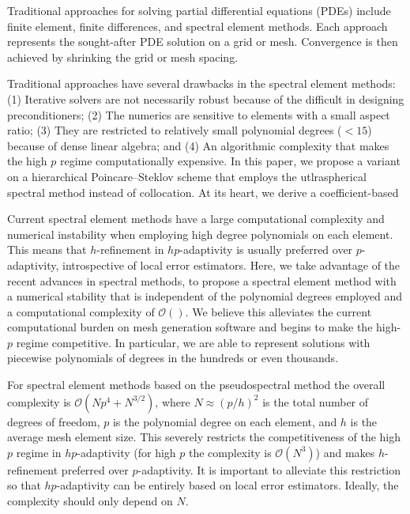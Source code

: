 \documentclass[review]{siamart171218}
\begin{document}
Traditional approaches for solving partial differential equations (PDEs) include finite element, finite differences, and spectral element methods. Each approach represents the sought-after PDE solution on a grid or mesh. Convergence is then achieved by shrinking the grid or mesh spacing. 

Traditional approaches have several drawbacks in the spectral element methods: (1) Iterative solvers are not necessarily robust because of the difficult in designing preconditioners; 
(2) The numerics are sensitive to elements with a small aspect ratio; (3) They are restricted to relatively small polynomial degrees ($<15$) because of dense linear algebra; and (4) An algorithmic complexity that makes the high $p$ regime computationally expensive. In this paper, we propose a variant on a hierarchical Poincare--Steklov scheme that employs the utlraspherical spectral method instead of collocation. At its heart, we derive a coefficient-based 




 
Current spectral element methods have a large computational complexity and numerical instability when employing high degree polynomials on each element. This means that $h$-refinement in $hp$-adaptivity is usually preferred over $p$-adaptivity, introspective of local error estimators. Here, we take advantage of the recent advances in spectral methods, to propose a spectral element method with a numerical stability that is independent of the polynomial degrees employed and a computational complexity of $\mathcal{O}()$. We believe this alleviates the current computational burden on mesh generation software and begins to make the high-$p$ regime competitive. In particular, we are able to represent solutions with piecewise polynomials of degrees in the hundreds or even thousands. 


For spectral element methods based on the pseudospectral method the overall complexity is $\mathcal{O}(Np^4 + N^{3/2})$, where $N \approx (p/h)^2$ is the total number of degrees of freedom, $p$ is the polynomial degree on each element, and $h$ is the average mesh element size. This  severely restricts the competitiveness of the high $p$ regime in $hp$-adaptivity (for high $p$ the complexity is $\mathcal{O}(N^3)$) and makes $h$-refinement preferred over $p$-adaptivity. It is important to alleviate this restriction so that $hp$-adaptivity can be entirely based on local error estimators. Ideally, the complexity should only depend on $N$.
\end{document}
